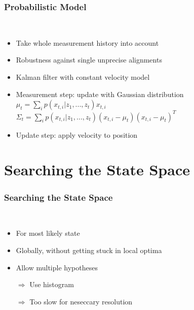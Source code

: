 \begin{frame}
  \frametitle{Probabilistic Model}
  \begin{description}[]
  \item[Motion Model] \hfill \\
  \begin{itemize}
  \item Take whole measurement history into account
  \item Robustness against single unprecise alignments
  \pause
  \item Kalman filter with constant velocity model
  \item Measurement step: update with Gaussian distribution\\
        $\mu_t=\sum_i p(x_{t,i}|z_1,...,z_t)x_{t,i}$\\
        $\Sigma_t=\sum_i p(x_{t,i}|z_1,...,z_t) (x_{t,i}-\mu_t)(x_{t,i}-\mu_t)^T$
  \item Update step: apply velocity to position
  \end{itemize}
  \end{description}
\end{frame}


\section{Searching the State Space}
\begin{frame}
  \frametitle{Searching the State Space}
  \begin{description}[]
  \item[Search the State Space] \hfill \\
  \pause
  \begin{itemize}
  \item For most likely state
  \item Globally, without getting stuck in local optima
  \item Allow multiple hypotheses
  \pause
  \item[$\Rightarrow$] Use histogram
  \pause
  \item[$\Rightarrow$] Too slow for neseccary resolution
  \end{itemize}
  \end{description}
\end{frame}

